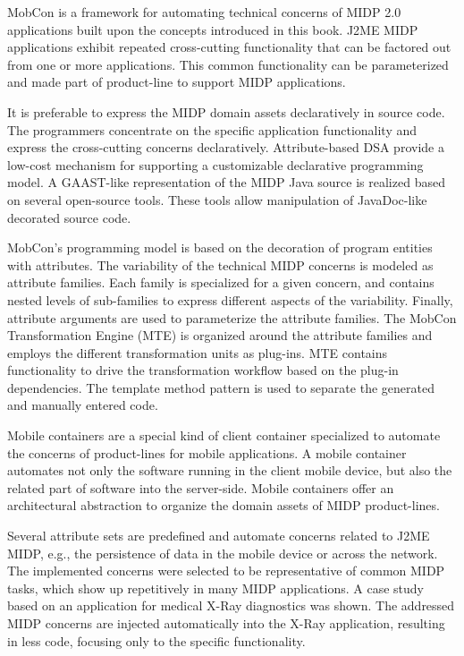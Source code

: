 
MobCon is a framework for automating technical concerns of MIDP 2.0 applications built upon the concepts introduced in this book. J2ME MIDP applications exhibit repeated cross-cutting functionality that can be factored out from one or more applications. This common functionality can be parameterized and made part of  product-line to support MIDP applications. 

It is preferable to express the MIDP domain assets declaratively in source code. The programmers concentrate on the specific application functionality and express the cross-cutting concerns declaratively. Attribute-based DSA provide a low-cost mechanism for supporting a customizable declarative programming model. A GAAST-like representation of the MIDP Java source is realized based on several open-source tools. These tools allow manipulation of JavaDoc-like decorated source code.

MobCon's programming model is based on the decoration of program entities with attributes. The variability of the technical MIDP concerns is modeled as attribute families. Each family is specialized for a given concern, and contains nested levels of sub-families to express different aspects of the variability. Finally, attribute arguments are used to parameterize the attribute families.
%
The MobCon Transformation Engine (MTE) is organized around the attribute families and employs the different transformation units as plug-ins. MTE contains functionality to drive the transformation workflow based on the plug-in dependencies. The template method pattern is used to separate the generated and manually entered code.

Mobile containers are a special kind of client container specialized to automate the concerns of product-lines for mobile applications. A mobile container automates not only the software running in the client mobile device, but also the related part of software into the server-side. Mobile containers offer an architectural abstraction to organize the domain assets of MIDP product-lines.

Several attribute sets are predefined and automate concerns related to J2ME MIDP, e.g., the persistence of data in the mobile device or across the network. The implemented concerns were selected to be representative of common MIDP tasks, which show up repetitively in many MIDP applications. A case study based on an application for medical X-Ray diagnostics was shown. The addressed MIDP concerns are injected automatically into the X-Ray application, resulting in less code, focusing only to the specific functionality.

